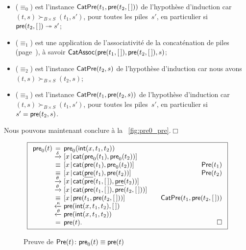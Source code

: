\begin{itemize}

  \item (\(\equiv_0\)) est l'instance
  \(\textsf{CatPre}({t_1,\textsf{pre}(t_2,[\,])})\) de l'hypothèse d'induction
  car \((t,s) \succ_{B \times S} (t_1,s')\), pour toutes les
  piles~\(s'\), en particulier si \(\textsf{pre}(t_2,[\,])
  \twoheadrightarrow s'\);

  \item (\(\equiv_1\)) est une application de l'associativité de la
  concaténation de piles
  (page~\pageref{proof_assoc_cat}), à savoir
  \(\textsf{CatAssoc}({\textsf{pre}(t_1,[\,]),\textsf{pre}(t_2,[\,]),s})\);

  \item (\(\equiv_2\)) est l'instance
  \(\textsf{CatPre}({t_2,s})\) de
  l'hypothèse d'induction car nous avons \((t,s) \succ_{B \times S}
  (t_2,s)\);

  \item (\(\equiv_3\)) est l'instance \(\textsf{CatPre}({t_1,
    \textsf{pre}(t_2,s)})\) de l'hypothèse d'induction car \((t,s)
  \succ_{B \times S} (t_1,s')\), pour toutes les piles~\(s'\), en
  particulier si \(s' = \textsf{pre}(t_2,s)\).
\end{itemize}
Nous pouvons maintenant conclure à la \fig~\vref{fig:pre0_pre}.\hfill\(\Box\)
\begin{figure}
\begin{equation*}
\boxed{%
\begin{array}{r@{\;}c@{\;}l@{\qquad}r}
\fun{pre}_0(t)
& = & \fun{pre}_0(\fun{int}(x,t_1,t_2))\\
& \xrightarrow{\smash{\delta}}
& \cons{x}{\fun{cat}(\fun{pre}_0(t_1), \fun{pre}_0(t_2))}\\
& \equiv & \cons{x}{\fun{cat}(\fun{pre}(t_1), \fun{pre}_0(t_2))}
& \IH{\pred{Pre}{t_1}}\\
& \equiv & \cons{x}{\fun{cat}(\ufun{pre}(t_1), \fun{pre}(t_2))}
& \IH{\pred{Pre}{t_2}}\\
& \xrightarrow{\smash{\theta}}
& \cons{x}{\fun{cat}(\fun{pre}(t_1,\el), \ufun{pre}(t_2))}\\
& \xrightarrow{\smash{\theta}}
& \cons{x}{\fun{cat}(\fun{pre}(t_1,\el), \fun{pre}(t_2,\el))}\\
& \equiv
& \cons{x}{\fun{pre}(t_1,\fun{pre}(t_2,\el))}
& \IH{\pred{CatPre}{t_1,\fun{pre}(t_2,\el)}}\\
& \xleftarrow{\smash{\kappa}}
& \fun{pre}(\fun{int}(x,t_1,t_2),\el)\\
& \xleftarrow{\smash{\theta}}
& \fun{pre}(\fun{int}(x,t_1,t_2))\\
& = & \fun{pre}(t). & \hfill\Box
\end{array}}
\end{equation*}
\caption{Preuve de \(\textsf{Pre}({t}) \colon \textsf{pre}_0(t) \equiv
  \textsf{pre}(t)\)}
\label{fig:pre0_pre}
\end{figure}

